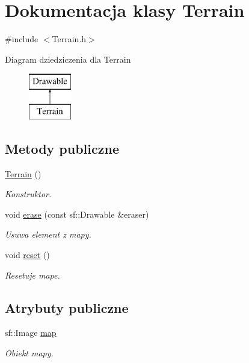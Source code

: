 \hypertarget{class_terrain}{}\section{Dokumentacja klasy Terrain}
\label{class_terrain}


{\ttfamily \#include $<$Terrain.\+h$>$}

Diagram dziedziczenia dla Terrain\begin{figure}[H]
\begin{center}
\leavevmode
\includegraphics[height=2.000000cm]{class_terrain}
\end{center}
\end{figure}
\subsection*{Metody publiczne}
\begin{DoxyCompactItemize}
\item 
\mbox{\hyperlink{class_terrain_a7160a06ab07a86ed97d23374405e8ef6}{Terrain}} ()
\begin{DoxyCompactList}\small\item\em Konstruktor. \end{DoxyCompactList}\item 
void \mbox{\hyperlink{class_terrain_a552c55d3ce93ae1c8988432acdf7aea1}{erase}} (const sf\+::\+Drawable \&eraser)
\begin{DoxyCompactList}\small\item\em Usuwa element z mapy. \end{DoxyCompactList}\item 
void \mbox{\hyperlink{class_terrain_a009d97df85f0704ad9ea3c61fcd11080}{reset}} ()
\begin{DoxyCompactList}\small\item\em Resetuje mape. \end{DoxyCompactList}\end{DoxyCompactItemize}
\subsection*{Atrybuty publiczne}
\begin{DoxyCompactItemize}
\item 
sf\+::\+Image \mbox{\hyperlink{class_terrain_afda7533fb267038f082301a417691483}{map}}
\begin{DoxyCompactList}\small\item\em Obiekt mapy. \end{DoxyCompactList}\end{DoxyCompactItemize}
